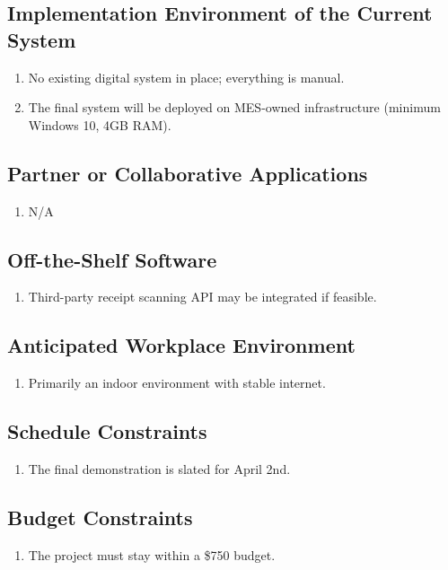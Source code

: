 \documentclass[12pt]{article}
\begin{document}
\subsection{Implementation Environment of the Current System}
\begin{enumerate}
  \item No existing digital system in place; everything is manual.
  \item The final system will be deployed on MES-owned infrastructure (minimum Windows 10, 4GB RAM).
\end{enumerate}

\subsection{Partner or Collaborative Applications}
\begin{enumerate}
  \item N/A
\end{enumerate}

\subsection{Off-the-Shelf Software}
\begin{enumerate}
  \item Third-party receipt scanning API may be integrated if feasible.
\end{enumerate}

\subsection{Anticipated Workplace Environment}
\begin{enumerate}
  \item Primarily an indoor environment with stable internet.
\end{enumerate}

\subsection{Schedule Constraints}
\begin{enumerate}
  \item The final demonstration is slated for April 2nd.
\end{enumerate}

\subsection{Budget Constraints}
\begin{enumerate}
  \item The project must stay within a \$750 budget.
\end{enumerate}
\end{document}
